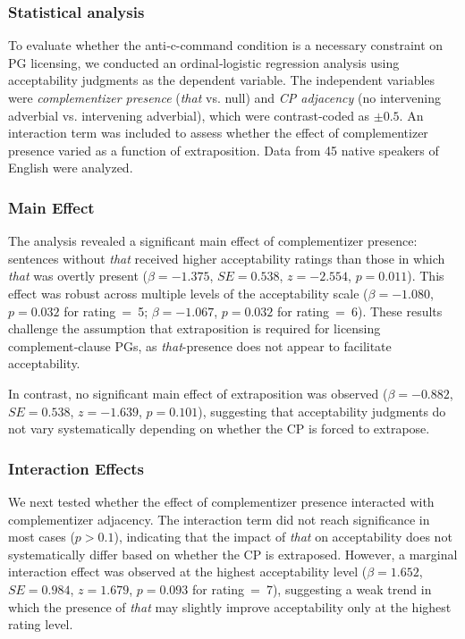 \documentclass[12pt]{article}
\begin{document}
\subsubsection{Statistical analysis}

To evaluate whether the anti‑c-command condition is a necessary constraint on PG licensing, we conducted an ordinal‑logistic regression analysis using acceptability judgments as the dependent variable. The independent variables were \textit{complementizer presence} (\textit{that} vs. null) and \textit{CP adjacency} (no intervening adverbial vs. intervening adverbial), which were contrast‑coded as $\pm0.5$. An interaction term was included to assess whether the effect of complementizer presence varied as a function of extraposition. Data from 45 native speakers of English were analyzed.

\subsubsection{Main Effect}
The analysis revealed a significant main effect of complementizer presence: sentences without \textit{that} received higher acceptability ratings than those in which \textit{that} was overtly present ($\beta = -1.375$, $SE = 0.538$, $z = -2.554$, $p = 0.011$). This effect was robust across multiple levels of the acceptability scale ($\beta = -1.080$, $p = 0.032$ for rating = 5; $\beta = -1.067$, $p = 0.032$ for rating = 6). These results challenge the assumption that extraposition is required for licensing complement‑clause PGs, as \textit{that}-presence does not appear to facilitate acceptability.

In contrast, no significant main effect of extraposition was observed ($\beta = -0.882$, $SE = 0.538$, $z = -1.639$, $p = 0.101$), suggesting that acceptability judgments do not vary systematically depending on whether the CP is forced to extrapose.

\subsubsection{Interaction Effects}
We next tested whether the effect of complementizer presence interacted with complementizer adjacency. The interaction term did not reach significance in most cases ($p > 0.1$), indicating that the impact of \textit{that} on acceptability does not systematically differ based on whether the CP is extraposed. However, a marginal interaction effect was observed at the highest acceptability level ($\beta = 1.652$, $SE = 0.984$, $z = 1.679$, $p = 0.093$ for rating = 7), suggesting a weak trend in which the presence of \textit{that} may slightly improve acceptability only at the highest rating level.
\end{document}

